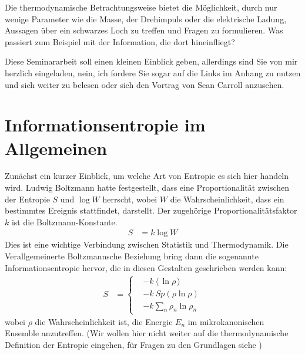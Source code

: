\documentclass[ngerman]{scrartcl}
\newcommand{\erw}[1]{\langle {#1} \rangle}
\begin{document}
Die thermodynamische Betrachtungsweise bietet die Möglichkeit, durch nur wenige Parameter wie die Masse, der Drehimpuls oder die elektrische Ladung, Aussagen über ein schwarzes Loch zu treffen und Fragen zu formulieren. Was passiert zum Beispiel mit der Information, die dort hineinfliegt?

Diese Seminararbeit soll einen kleinen Einblick geben, allerdings sind Sie von mir herzlich eingeladen, nein, ich fordere Sie sogar auf die Links im Anhang zu nutzen und sich weiter zu belesen oder sich den Vortrag von Sean Carroll \cite{SeanCarrollVortrag} anzusehen.  

\section{Informationsentropie im Allgemeinen} \label{InfoentropieAllg}
Zunächst ein kurzer Einblick, um welche Art von Entropie es sich hier handeln wird. Ludwig Boltzmann hatte festgestellt, dass eine Proportionalität zwischen der Entropie $S$ und $\log W$ herrscht, wobei $W$ die Wahrscheinlichkeit, dass ein bestimmtes Ereignis stattfindet, darstellt. Der zugehörige Proportionalitätsfaktor $k$ ist die Boltzmann-Konstante.
	\begin{align}
		S &= k \log W
	\end{align}
Dies ist eine wichtige Verbindung zwischen Statistik und Thermodynamik. 
Die Verallgemeinerte Boltzmannsche Beziehung bring dann die sogenannte Informationsentropie hervor, die in diesen Gestalten geschrieben werden kann:	
	\begin{align} \label{Informationsentropie}
		S &=
		\left\{
		\begin{aligned}
		&- k ~\erw{\,\ln \rho\,} \\
		&-k~ Sp(\rho \ln \rho) \\
		&-k \sum_n \rho_n \ln \rho_n
		\end{aligned}
		\right.
	\end{align}
wobei $\rho$ die Wahrscheinlichkeit ist, die Energie $E_n$ im mikrokanonischen Ensemble anzutreffen. 
(Wir wollen hier nicht weiter auf die thermodynamische Definition der Entropie eingehen, für Fragen zu den Grundlagen siehe \cite{Brenig})
\end{document}
